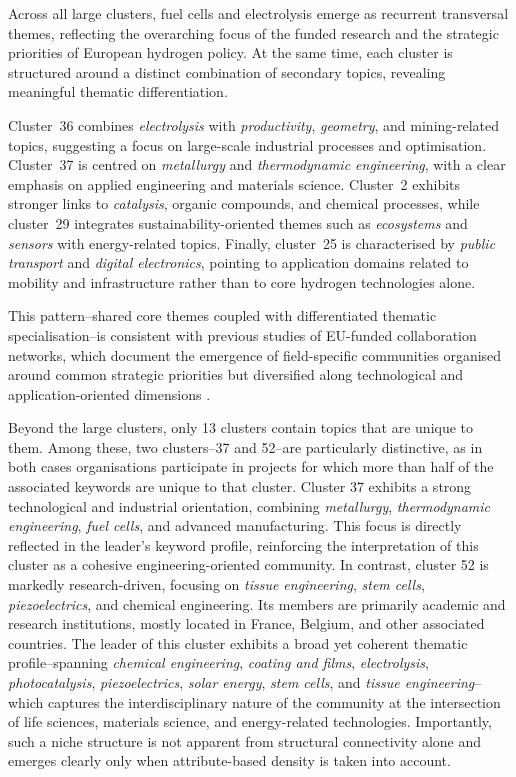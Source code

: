 \documentclass[11pt]{article}
\begin{document}
Across all large clusters, fuel cells and electrolysis emerge as recurrent transversal themes, reflecting the overarching focus of the funded research and the strategic priorities of European hydrogen policy. At the same time, each cluster is structured around a distinct combination of secondary topics, revealing meaningful thematic differentiation.

Cluster~36 combines \textit{electrolysis} with \textit{productivity}, \textit{geometry}, and mining-related topics, suggesting a focus on large-scale industrial processes and optimisation. Cluster~37 is centred on \textit{metallurgy} and \textit{thermodynamic engineering}, with a clear emphasis on applied engineering and materials science. Cluster~2 exhibits stronger links to \textit{catalysis}, organic compounds, and chemical processes, while cluster~29 integrates sustainability-oriented themes such as \textit{ecosystems} and \textit{sensors} with energy-related topics. Finally, cluster~25 is characterised by \textit{public transport} and \textit{digital electronics}, pointing to application domains related to mobility and infrastructure rather than to core hydrogen technologies alone.

This pattern--shared core themes coupled with differentiated thematic specialisation--is consistent with previous studies of EU-funded collaboration networks, which document the emergence of field-specific communities organised around common strategic priorities but diversified along technological and application-oriented dimensions \citep{barber2013community, Balland2019SmartDiversification}.

Beyond the large clusters, only 13 clusters contain topics that are unique to them. Among these, two clusters--37 and 52--are particularly distinctive, as in both cases organisations participate in projects for which more than half of the associated keywords are unique to that cluster. Cluster 37 exhibits a strong technological and industrial orientation, combining \textit{metallurgy}, \textit{thermodynamic engineering}, \textit{fuel cells}, and advanced manufacturing. This focus is directly reflected in the leader’s keyword profile, reinforcing the interpretation of this cluster as a cohesive engineering-oriented community.
In contrast, cluster 52 is markedly research-driven, focusing on \textit{tissue engineering}, \textit{stem cells}, \textit{piezoelectrics}, and chemical engineering. Its members are primarily academic and research institutions, mostly located in France, Belgium, and other associated countries. 
The leader of this cluster exhibits a broad yet coherent thematic profile--spanning \textit{chemical engineering}, \textit{coating and films}, \textit{electrolysis}, \textit{photocatalysis}, \textit{piezoelectrics}, \textit{solar energy}, \textit{stem cells}, and \textit{tissue engineering}--which captures the interdisciplinary nature of the community at the intersection of life sciences, materials science, and energy-related technologies.
Importantly, such a niche structure is not apparent from structural connectivity alone and emerges clearly only when attribute-based density is taken into account.
\end{document}
